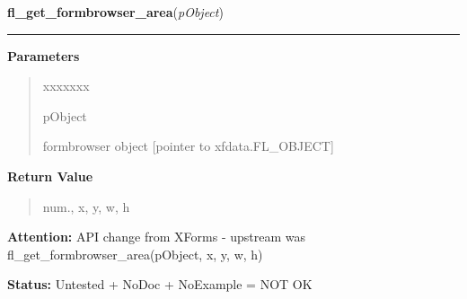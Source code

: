 \hspace{.8\funcindent}\begin{boxedminipage}{\funcwidth}

    \raggedright \textbf{fl\_get\_formbrowser\_area}(\textit{pObject})

    \vspace{-1.5ex}

    \rule{\textwidth}{0.5\fboxrule}
\setlength{\parskip}{2ex}
\setlength{\parskip}{1ex}
      \textbf{Parameters}
      \vspace{-1ex}

      \begin{quote}
        \begin{Ventry}{xxxxxxx}

          \item[pObject]

          formbrowser object [pointer to xfdata.FL\_OBJECT]

        \end{Ventry}

      \end{quote}

      \textbf{Return Value}
    \vspace{-1ex}

      \begin{quote}
      num., x, y, w, h

      \end{quote}

\textbf{Attention:} API change from XForms - upstream was fl\_get\_formbrowser\_area(pObject, 
x, y, w, h)



\textbf{Status:} Untested + NoDoc + NoExample = NOT OK



    \end{boxedminipage}

    \label{xformslib:library:fl_set_formbrowser_scroll}

    \vspace{0.5ex}

